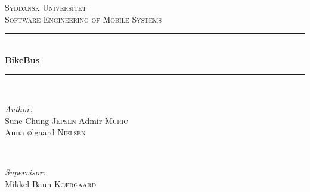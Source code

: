 \documentclass[a4paper]{article}
\theoremstyle{plain}
\begin{document}
\begin{titlepage}

\newcommand{\HRule}{\rule{\linewidth}{0.5mm}} %

\center %
 

\textsc{\LARGE Syddansk Universitet}\\[0.5cm] %
\textsc{\large Software Engineering of Mobile Systems}\\[1.5cm] %



\HRule \\[0.4cm]
{ \huge \bfseries BikeBus}\\[0.4cm] %
\HRule \\[1.5cm]
 

\begin{minipage}{0.4\textwidth}
\begin{flushleft} \large
\emph{Author:}\\
Sune Chung \textsc{Jepsen} %
Admir \textsc{Muric}\\ %
Anna \textsc{\o}lgaard \textsc{Nielsen} %
\end{flushleft}
\end{minipage}
~
\begin{minipage}{0.4\textwidth}
\begin{flushright} \large
\emph{Supervisor:} \\
Mikkel Baun \textsc{Kjærgaard} %
\end{flushright}
\end{minipage}\\[2cm]


\end{titlepage}
\end{document}
